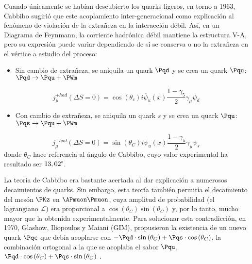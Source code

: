 Cuando únicamente se habían descubierto los quarks ligeros, en torno a 1963, Cabbibo sugirió que este acoplamiento inter-generacional como explicación al fenómeno de violación de la extrañeza en la interacción débil. Así, en un Diagrama de Feynmann, la corriente hadrónica débil mantiene la estructura V-A, pero su expresión puede variar dependiendo de si se conserva o no la extrañeza en el vértice a estudio del proceso:
\begin{itemize}
\item Sin cambio de extrañeza, se aniquila un quark $\Pqd$ y se crea un quark $\Pqu$: $\Pqd \rightarrow \Pqu + \PWm$
\end{itemize}
\begin{equation}
j_{\mu}^{+had}(\Delta S= 0)=\cos \left( \theta _{c}\right) i\overline{\psi }_{u}\left( x\right) \dfrac{1-\gamma _{5}}{2}\gamma _{\mu }\psi _{d}
\end{equation}
\begin{itemize}
\item Con cambio de extrañeza, se aniquila un quark $s$ y se crea un quark $\Pqu$: $\Pqs \rightarrow \Pqu + \PWm$
\end{itemize}
\begin{equation}
j_{\mu}^{+had}(\Delta S= 0)=\sin \left( \theta _{C}\right) i\overline{\psi }_{u}\left( x\right) \dfrac{1-\gamma _{5}}{2}\gamma _{\mu }\psi _{s}
\end{equation}
donde $\theta_{C}$ hace referencia al ángulo de Cabbibo, cuyo valor experimental ha resultado ser $13,02\degree$.

La teoría de Cabbibo era bastante acertada al dar explicación a numerosos decaimientos de quarks. Sin embargo, esta teoría también permitía el decaimiento del mesón $\PKz$ en $\APmuon\Pmuon$, cuya amplitud de probabilidad (el lagrangiano $\mathcal{L}$) era proporcional a $\cos \left( \theta _{C}\right) \sin \left( \theta _{C}\right)$ y, por lo tanto, mucho mayor que la obtenida experimentalmente.  Para solucionar esta contradicción, en 1970, Glashow, Iliopoulos y Maiani (GIM), propusieron la existencia de un nuevo quark $\Pqc$ que debía acoplarse con $-\Pqd \cdot \sin \left( \theta _{C}\right) + \Pqs \cdot \cos \left( \theta_C \right)$, la combinación ortogonal a la que se acoplaba el sabor $\Pqu$, $\Pqd \cdot \cos \left( \theta _{C}\right) + \Pqs \cdot \sin \left( \theta _{C}\right)$ \cite{Griffiths2008}.

